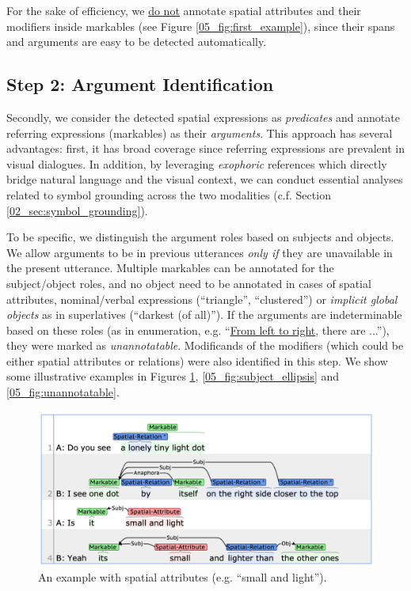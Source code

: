 For the sake of efficiency, we \underline{do not} annotate spatial attributes and their modifiers inside markables (see Figure \ref{05_fig:first_example}), since their spans and arguments are easy to be detected automatically.

\subsection{Step 2: Argument Identification}
\label{05_subsec:argument_identification}

Secondly, we consider the detected spatial expressions as \textit{predicates} and annotate referring expressions (markables) as their \textit{arguments}. This approach has several advantages: first, it has broad coverage since referring expressions are prevalent in visual dialogues. In addition, by leveraging \textit{exophoric} references which directly bridge natural language and the visual context, we can conduct essential analyses related to symbol grounding across the two modalities (c.f. Section \ref{02_sec:symbol_grounding}).

To be specific, we distinguish the argument roles based on subjects and objects. We allow arguments to be in previous utterances \textit{only if} they are unavailable in the present utterance. Multiple markables can be annotated for the subject/object roles, and no object need to be annotated in cases of spatial attributes, nominal/verbal expressions (``triangle'', ``clustered'') or \textit{implicit global objects} as in superlatives (``darkest (of all)''). If the arguments are indeterminable based on these roles (as in enumeration, e.g. ``\underline{From left to right}, there are ...''), they were marked as \textit{unannotatable}. Modificands of the modifiers (which could be either spatial attributes or relations) were also identified in this step. We show some illustrative examples in Figures \ref{05_fig:spatial_attribute}, \ref{05_fig:subject_ellipsis} and \ref{05_fig:unannotatable}.

\begin{figure}[t!]
\centering
\includegraphics[width=0.6\columnwidth]{C_09b2a91332a64c12a3235d69a9e1f5da.pdf}
\caption{An example with spatial attributes (e.g. ``small and light'').}
\label{05_fig:spatial_attribute}
\end{figure}

